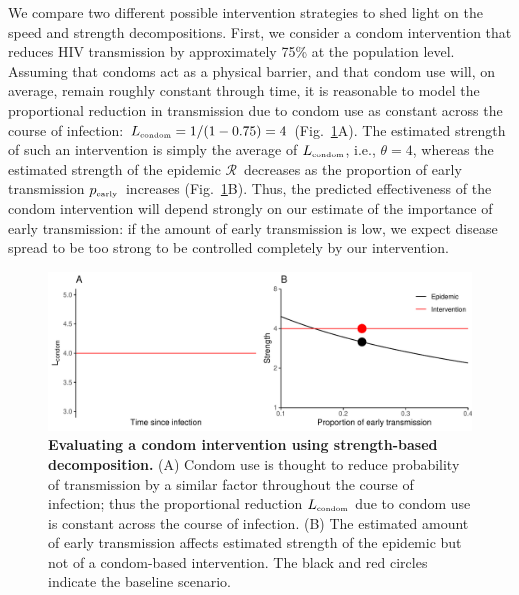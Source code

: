 \documentclass[12pt]{article}
\newcommand{\comment}{RENEW}
\renewcommand{\comment}[3]{\textcolor{#1}{\textbf{[#2: }\textit{#3}\textbf{]}}}
\renewcommand{\comment}[3]{}
\newcommand{\jd}[1]{\comment{cyan}{JD}{#1}}
\newcommand{\RR}{\ensuremath{{\mathcal R}}}
\newcommand{\tsub}[2]{#1_{{\textrm{\tiny #2}}}}
\newcommand{\pEarly}{\ensuremath{\tsub{p}{early}}}
\newcommand{\figref}[1]{Fig.~\ref{fig:#1}}
\newcommand{\figlab}[1]{\label{fig:#1}}
\begin{document}
We compare two different possible intervention strategies to shed light on the speed and strength decompositions.
First, we consider a condom intervention that reduces HIV transmission by approximately 75\% at the population level.
Assuming that condoms act as a physical barrier, and that condom use will, on average, remain roughly constant through time, it is reasonable to model the proportional reduction in transmission due to condom use as constant across the course of infection: $\tsub{L}{condom} = 1/(1-0.75) = 4$ (\figref{condom}A).
The estimated strength of such an intervention is simply the average of $\tsub{L}{condom}$, i.e., $\theta=4$, whereas the estimated strength of the epidemic \RR\ decreases as the proportion of early transmission \pEarly\ increases (\figref{condom}B).
Thus, the predicted effectiveness of the condom intervention will depend strongly on our estimate of the importance of early transmission: if the amount of early transmission is low, we expect disease spread to be too strong to be controlled completely by our intervention.

\begin{figure}[!t]
\includegraphics[width=\textwidth]{../figure/condom.pdf}
\caption{
\textbf{Evaluating a condom intervention using strength-based decomposition.}
(A) Condom use is thought to reduce probability of transmission by a similar factor throughout the course of infection; thus the proportional reduction $\tsub{L}{condom}$ due to condom use is constant across the course of infection.
(B) The estimated amount of early transmission affects estimated strength of the epidemic but not of a condom-based intervention.
The black and red circles indicate the baseline scenario.
}
\figlab{condom}
\end{figure}

\end{document}
